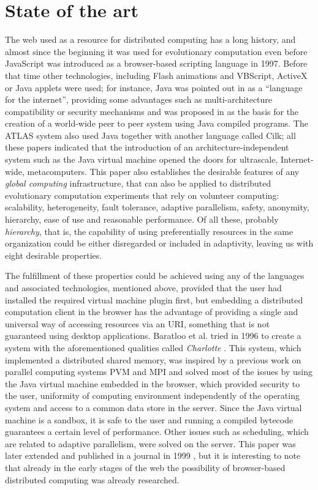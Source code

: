 \documentclass[journal,onecolumn]{IEEEtran}
\begin{document}
\section{State of the art}
\label{sec:soa}

The web used as a resource for distributed computing has a
long history, and almost since the beginning it was used for
evolutionary computation even before JavaScript was
introduced as a browser-based scripting language in 1997. Before that
time other technologies,
 including Flash animations and VBScript, ActiveX or Java applets were
used; for instance, Java was pointed out in \cite{soares1998get} as a
``language for the
internet'', providing some advantages such as multi-architecture compatibility or
security mechanisms and was proposed in \cite{chandy1996world} as the
basis for the creation of a world-wide peer to peer system using Java
compiled programs. The ATLAS system
\cite{Baldeschwieler:1996:TIG:504450.504482} also used Java together
with another language called Cilk; all these papers indicated that
the introduction of an architecture-independent system such as the
Java virtual machine opened the doors for ultrascale, Internet-wide,
metacomputers. This paper also establishes the desirable features of
any {\em global computing} infrastructure, that can also be applied to
distributed evolutionary computation experiments that rely on
volunteer computing: scalability, heterogeneity, fault tolerance,
adaptive parallelism, safety, anonymity, hierarchy, ease of use and
reasonable performance. Of all these, probably {\em hierarchy}, that
is, the capability of using preferentially resources in the same
organization could be either disregarded or included in adaptivity,
leaving us with eight desirable properties.

The fulfillment of these properties could be achieved using any of the
languages and associated technologies, mentioned above, provided that the user had
installed the required virtual machine plugin first, but embedding a
distributed computation client in the browser has the advantage of
providing a single and universal way of accessing resources via an
URI, something that is not guaranteed using desktop
applications. Baratloo et al. tried in 1996 to create a system with
the aforementioned qualities called {\em Charlotte}
\cite{baratloo1996charlotte}. This system, which implemented a
distributed shared memory, was inspired by a previous work
on parallel computing systems PVM and MPI and solved most of the issues by
using the Java virtual machine embedded in the browser,
which provided
security to the user, uniformity of computing environment
independently of the operating system and access to a common data store in the
server. Since the Java virtual machine is a sandbox, it is safe to the user
and running a compiled bytecode guarantees a certain level of
performance.
Other issues such as scheduling, which are related to adaptive 
parallelism, were solved on the server. This
paper was later extended and published in a journal in 1999
\cite{baratloo1999charlotte}, but it is interesting to note that
already in the early stages of the web the possibility of
browser-based distributed computing was already researched.
\end{document}
